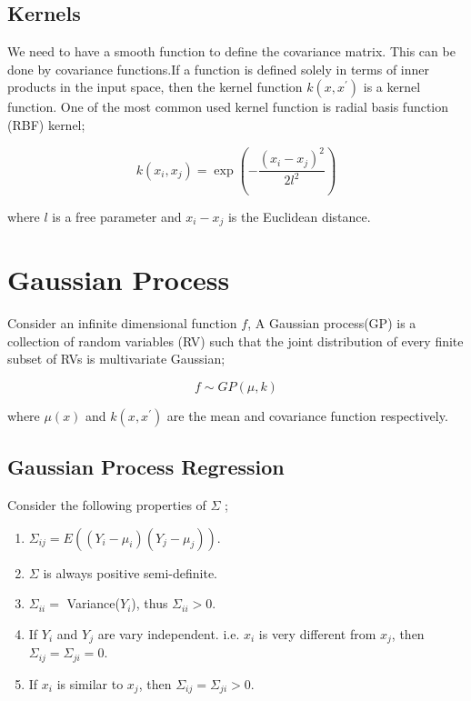 \documentclass{article}
\begin{document}
\subsection{Kernels}

We need to have a smooth function to define the covariance matrix. This can be done by covariance functions.If a function is defined solely in terms of inner products in the input space, then the kernel function $k(x, x^{\prime})$ is a kernel function. One of the most common used kernel function is radial basis function (RBF) kernel;

\begin{equation}
k(x_{i}, x_{j}) = \exp(-\frac{(x_{i} - x_{j})^{2}}{2l^{2}})
\end{equation}

where $l$ is a free parameter and $x_{i} - x_{j}$ is the Euclidean distance.


\section{Gaussian Process}

Consider an infinite dimensional function $f$, A Gaussian process(GP) is a collection of random variables (RV) such that the joint distribution of every finite subset of RVs is multivariate Gaussian;

\begin{equation}
f \sim GP(\mu, k)
\end{equation}

where $\mu(x)$ and $k(x, x^{\prime})$ are the mean and covariance function respectively.

\subsection{Gaussian Process Regression}

Consider the following properties of $\Sigma$ \cite{wang2020intuitive};

\begin{enumerate}
\item $\Sigma_{ij} = E((Y_{i} - \mu_{i})(Y_{j} - \mu_{j}))$.
\item $\Sigma$ is always positive semi-definite.
\item $\Sigma_{ii} =$ Variance($Y_{i}$), thus $\Sigma_{ii} > 0$.
\item If $Y_{i}$ and $Y_{j}$ are vary independent. i.e. $x_{i}$ is very different from $x_{j}$, then $\Sigma_{ij} = \Sigma_{ji} = 0$.
\item If $x_{i}$ is similar to $x_{j}$, then $\Sigma_{ij} = \Sigma_{ji} > 0$.
\end{enumerate}
\end{document}
